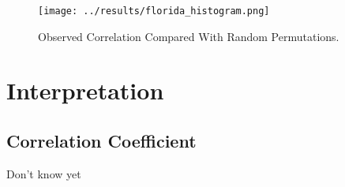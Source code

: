 \begin{figure}[h!]
    \begin{center}
        \texttt{[image: ../results/florida\_histogram.png]}
    \end{center}
    \caption{Observed Correlation Compared With Random Permutations.}
    \label{fig1}
\end{figure}

\chapter{Interpretation}

\section{Correlation Coefficient}

Don't know yet







